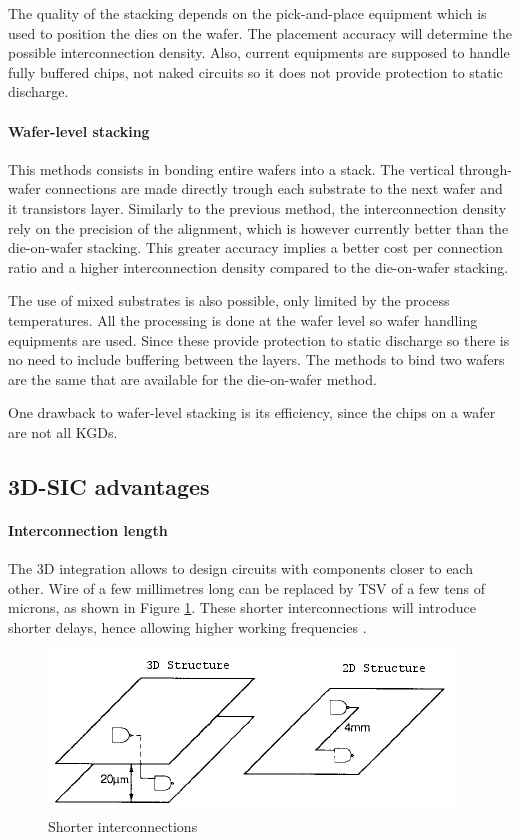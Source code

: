 The quality of the stacking depends on the pick-and-place equipment which is used to position the dies on the wafer. The placement accuracy will determine the possible interconnection density. Also, current equipments are supposed to handle fully buffered chips, not naked circuits so it does not provide protection to static discharge. 

\paragraph{Wafer-level stacking}

This methods consists in bonding entire wafers into a stack. The vertical through-wafer connections are made directly trough each substrate to the next wafer and it transistors layer. Similarly to the previous method, the interconnection density rely on the precision of the alignment, which is however currently better than the die-on-wafer stacking. This greater accuracy implies a better cost per connection ratio and a higher interconnection density compared to the die-on-wafer stacking.

The use of mixed substrates is also possible, only limited by the process temperatures. All the processing is done at the wafer level so wafer handling equipments are used. Since these provide protection to static discharge so there is no need to include buffering between the layers. The methods to bind two wafers are the same that are available for the die-on-wafer method.

One drawback to wafer-level stacking is its efficiency, since the chips on a wafer are not all KGDs.

\subsection{3D-SIC advantages}

\paragraph{Interconnection length}

The 3D integration allows to design circuits with components closer to each other. Wire of a few millimetres long can be replaced by TSV of a few tens of microns, as shown in Figure \ref{fig:wire}. These shorter interconnections will introduce shorter delays, hence allowing higher working frequencies \cite{659500,981091}.

\begin{figure}[h!]
\begin{center}
\includegraphics[width=0.75\linewidth]{wire.png}
\end{center}
\vspace{-0.5cm}
\caption{Shorter interconnections \cite{659500}}
\label{fig:wire}
\end{figure}

